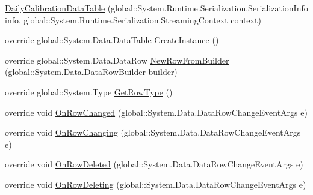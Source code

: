 \begin{DoxyCompactItemize}
\hyperlink{class_env_int_1_1_win32_1_1_field_tech_1_1_manager_1_1_data_sets_1_1_guide_ware_mobile_data_set_5b380d875f3f569d74f6183f0c2ee8d7_af63fac12642aa3387edd7a908f8cfed6}{Daily\+Calibration\+Data\+Table} (global\+::\+System.\+Runtime.\+Serialization.\+Serialization\+Info info, global\+::\+System.\+Runtime.\+Serialization.\+Streaming\+Context context)
\item 
override global\+::\+System.\+Data.\+Data\+Table \hyperlink{class_env_int_1_1_win32_1_1_field_tech_1_1_manager_1_1_data_sets_1_1_guide_ware_mobile_data_set_5b380d875f3f569d74f6183f0c2ee8d7_a6017a8fe58bf41b26e95ccf095791865}{Create\+Instance} ()
\item 
override global\+::\+System.\+Data.\+Data\+Row \hyperlink{class_env_int_1_1_win32_1_1_field_tech_1_1_manager_1_1_data_sets_1_1_guide_ware_mobile_data_set_5b380d875f3f569d74f6183f0c2ee8d7_af392db4a8cd589d1bf5202e04f9ef907}{New\+Row\+From\+Builder} (global\+::\+System.\+Data.\+Data\+Row\+Builder builder)
\item 
override global\+::\+System.\+Type \hyperlink{class_env_int_1_1_win32_1_1_field_tech_1_1_manager_1_1_data_sets_1_1_guide_ware_mobile_data_set_5b380d875f3f569d74f6183f0c2ee8d7_adeeffed383450f0568e97d829f443ae0}{Get\+Row\+Type} ()
\item 
override void \hyperlink{class_env_int_1_1_win32_1_1_field_tech_1_1_manager_1_1_data_sets_1_1_guide_ware_mobile_data_set_5b380d875f3f569d74f6183f0c2ee8d7_a107dad9310b57f8f496cb9d81d4bdd1a}{On\+Row\+Changed} (global\+::\+System.\+Data.\+Data\+Row\+Change\+Event\+Args e)
\item 
override void \hyperlink{class_env_int_1_1_win32_1_1_field_tech_1_1_manager_1_1_data_sets_1_1_guide_ware_mobile_data_set_5b380d875f3f569d74f6183f0c2ee8d7_a66250d57ed7f2bb7792a9da90d1337fe}{On\+Row\+Changing} (global\+::\+System.\+Data.\+Data\+Row\+Change\+Event\+Args e)
\item 
override void \hyperlink{class_env_int_1_1_win32_1_1_field_tech_1_1_manager_1_1_data_sets_1_1_guide_ware_mobile_data_set_5b380d875f3f569d74f6183f0c2ee8d7_a208ff57a84a3cb9a324916cb1f297831}{On\+Row\+Deleted} (global\+::\+System.\+Data.\+Data\+Row\+Change\+Event\+Args e)
\item 
override void \hyperlink{class_env_int_1_1_win32_1_1_field_tech_1_1_manager_1_1_data_sets_1_1_guide_ware_mobile_data_set_5b380d875f3f569d74f6183f0c2ee8d7_a3ef54fb6f1859c619e22114247737e84}{On\+Row\+Deleting} (global\+::\+System.\+Data.\+Data\+Row\+Change\+Event\+Args e)
\end{DoxyCompactItemize}
